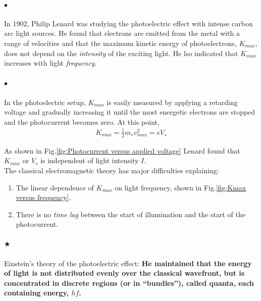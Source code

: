 \documentclass[a4paper]{report}
\begin{document}
            \paragraph{$\bullet$} In 1902,  Philip Lenard was studying the photoelectric effect with 
            intense carbon arc light sources. He found that electrons are emitted from the metal with a range of 
            velocities and that the maximum kinetic energy of photoelectrons, $K_{max}$, does not depend on the 
            \textit{intensity} of the exciting light. He lso indicated that $K_{max}$ increases with light \textit{frequency}.

            \paragraph{$\bullet$} In the photoelectric setup, $K_{max}$ is easily measured by applying a retarding voltage and gradually 
            increasing it until the most energetic electrons are stopped and the photocurrent becomes zero. At this point,
            \begin{align}
                \label{eq:Kmax of a photoelectron}
                K_{max} = \frac{1}{2} m_e v^2_{max} = eV_s
            \end{align}
            
            As shown in Fig.\eqref{fig:Photocurrent versus applied voltage} Lenard found that 
            $K_{max}$ or $V_s$ is independent of light intensity $I$.\\
            The classical electromagnetic theory has major difficulties explaining:
            \begin{enumerate}
                \item The linear dependence of  $K_{max}$ on light frequency, shown in Fig.\eqref{fig:Kmax versus frequency}.
                \item There is no \textit{time lag} between the start of illumination and the start of the photocurrent.
            \end{enumerate}

            \paragraph{$\bigstar$} Einstein’s theory of the photoelectric effect:
            \textbf{\color{c3}
            He maintained that the energy of light is not distributed evenly over the classical wavefront, 
            but is concentrated in discrete regions (or in “bundles”), called quanta, each containing energy, $hf$.}
\end{document}
